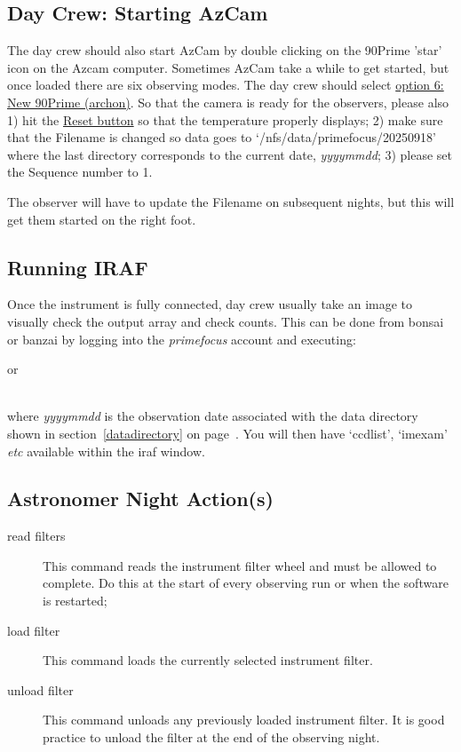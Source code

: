 \documentclass[12pt,twoside]{article}
\begin{document}
\subsection{Day Crew: Starting AzCam}

The day crew should also start AzCam by double clicking on the 90Prime 'star' icon on the Azcam computer.  Sometimes AzCam take a while to get started, but once loaded there are six observing modes.  The day crew should select \underline{option 6: New 90Prime (archon)}.  So that the camera is ready for the observers, please also 1) hit the \underline{Reset button} so that the temperature properly displays; 2) make sure that the Filename is changed so data goes to `/nfs/data/primefocus/20250918' where the last directory corresponds to the current date, {\it yyyymmdd}; 3) please set the Sequence number to 1.

\noindent The observer will have to update the Filename on subsequent nights, but this will get them started on the right foot.


\subsection{Running IRAF}
\label{Running IRAF}
Once the instrument is fully connected, day crew usually take an image to visually check the output array and check counts. This can be done
from {\sfmagenta bonsai} or {\sfmagenta banzai} by logging into the \emph{primefocus} account and executing: \\



\noindent or

 \\

where \emph{yyyymmdd} is the observation date associated with the data directory shown in section~\ref{datadirectory} on page~\pageref{datadirectory}. You will then have `ccdlist', `imexam' \emph{etc} available within the iraf window.

\subsection{Astronomer Night Action(s)}
\label{astronomernightactions}

\begin{description}
 \item[{\sc read filters}] This command reads the instrument filter wheel and must be allowed to complete. 
Do this at the start of every observing run or when the software is restarted;
 \item[{\sc load filter}] This command loads the currently selected instrument filter.
 \item[{\sc unload filter}] This command unloads any previously loaded instrument filter. 
It is good practice to unload the filter at the end of the observing night.
\end{description}
\end{document}
